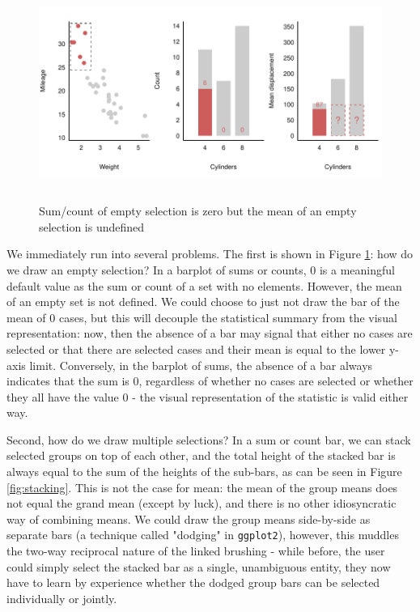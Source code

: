 \documentclass[12pt,a4paper]{article}
\begin{document}
\begin{figure}[H]
\centering
\includegraphics[height=70mm]{./figure01.pdf}
\caption{Sum/count of empty selection is zero but the mean of an empty selection is undefined}
\label{fig:empty}
\end{figure}

We immediately run into several problems. The first is shown in Figure \ref{fig:empty}: how do we draw an empty selection? In a barplot of sums or counts, 0 is a meaningful default value as the sum or count of a set with no elements. However, the mean of an empty set is not defined. We could choose to just not draw the bar of the mean of 0 cases, but this will decouple the statistical summary from the visual representation: now, then the absence of a bar may signal that either no cases are selected or that there are selected cases and their mean is equal to the lower y-axis limit. Conversely, in the barplot of sums, the absence of a bar always indicates that the sum is 0, regardless of whether no cases are selected or whether they all have the value 0 - the visual representation of the statistic is valid either way.  

Second, how do we draw multiple selections? In a sum or count bar, we can stack selected groups on top of each other, and the total height of the stacked bar is always equal to the sum of the heights of the sub-bars, as can be seen in Figure \ref{fig:stacking}. This is not the case for mean: the mean of the group means does not equal the grand mean (except by luck), and there is no other idiosyncratic way of combining means. We could draw the group means side-by-side as separate bars (a technique called "dodging" in \texttt{ggplot2}), however, this muddles the two-way reciprocal nature of the linked brushing - while before, the user could simply select the stacked bar as a single, unambiguous entity, they now have to learn by experience whether the dodged group bars can be selected individually or jointly.
\end{document}
